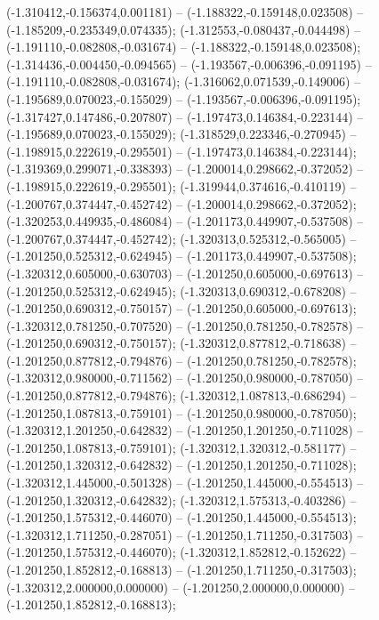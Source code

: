  (-1.310412,-0.156374,0.001181) -- (-1.188322,-0.159148,0.023508) -- (-1.185209,-0.235349,0.074335);
 (-1.312553,-0.080437,-0.044498) -- (-1.191110,-0.082808,-0.031674) -- (-1.188322,-0.159148,0.023508);
 (-1.314436,-0.004450,-0.094565) -- (-1.193567,-0.006396,-0.091195) -- (-1.191110,-0.082808,-0.031674);
 (-1.316062,0.071539,-0.149006) -- (-1.195689,0.070023,-0.155029) -- (-1.193567,-0.006396,-0.091195);
 (-1.317427,0.147486,-0.207807) -- (-1.197473,0.146384,-0.223144) -- (-1.195689,0.070023,-0.155029);
 (-1.318529,0.223346,-0.270945) -- (-1.198915,0.222619,-0.295501) -- (-1.197473,0.146384,-0.223144);
 (-1.319369,0.299071,-0.338393) -- (-1.200014,0.298662,-0.372052) -- (-1.198915,0.222619,-0.295501);
 (-1.319944,0.374616,-0.410119) -- (-1.200767,0.374447,-0.452742) -- (-1.200014,0.298662,-0.372052);
 (-1.320253,0.449935,-0.486084) -- (-1.201173,0.449907,-0.537508) -- (-1.200767,0.374447,-0.452742);
 (-1.320313,0.525312,-0.565005) -- (-1.201250,0.525312,-0.624945) -- (-1.201173,0.449907,-0.537508);
 (-1.320312,0.605000,-0.630703) -- (-1.201250,0.605000,-0.697613) -- (-1.201250,0.525312,-0.624945);
 (-1.320313,0.690312,-0.678208) -- (-1.201250,0.690312,-0.750157) -- (-1.201250,0.605000,-0.697613);
 (-1.320312,0.781250,-0.707520) -- (-1.201250,0.781250,-0.782578) -- (-1.201250,0.690312,-0.750157);
 (-1.320312,0.877812,-0.718638) -- (-1.201250,0.877812,-0.794876) -- (-1.201250,0.781250,-0.782578);
 (-1.320312,0.980000,-0.711562) -- (-1.201250,0.980000,-0.787050) -- (-1.201250,0.877812,-0.794876);
 (-1.320312,1.087813,-0.686294) -- (-1.201250,1.087813,-0.759101) -- (-1.201250,0.980000,-0.787050);
 (-1.320312,1.201250,-0.642832) -- (-1.201250,1.201250,-0.711028) -- (-1.201250,1.087813,-0.759101);
 (-1.320312,1.320312,-0.581177) -- (-1.201250,1.320312,-0.642832) -- (-1.201250,1.201250,-0.711028);
 (-1.320312,1.445000,-0.501328) -- (-1.201250,1.445000,-0.554513) -- (-1.201250,1.320312,-0.642832);
 (-1.320312,1.575313,-0.403286) -- (-1.201250,1.575312,-0.446070) -- (-1.201250,1.445000,-0.554513);
 (-1.320312,1.711250,-0.287051) -- (-1.201250,1.711250,-0.317503) -- (-1.201250,1.575312,-0.446070);
 (-1.320312,1.852812,-0.152622) -- (-1.201250,1.852812,-0.168813) -- (-1.201250,1.711250,-0.317503);
 (-1.320312,2.000000,0.000000) -- (-1.201250,2.000000,0.000000) -- (-1.201250,1.852812,-0.168813);
